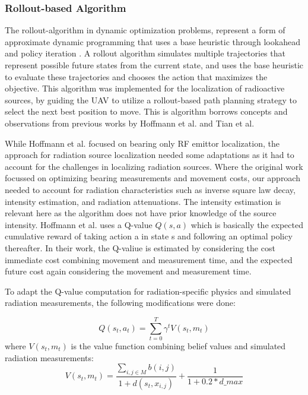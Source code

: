 \documentclass[../report.tex]{subfiles}
\begin{document}
    \subsubsection{Rollout-based Algorithm}
    The rollout-algorithm in dynamic optimization problems, represent a form of approximate dynamic programming that uses a base heuristic through lookahead and policy iteration \cite{bertsekas2013rollout}. 
    A rollout algorithm simulates multiple trajectories that represent possible future states from the current state, and uses the base heuristic to evaluate these trajectories and chooses the 
    action that maximizes the objective. This algorithm was implemented for the localization of radioactive sources, by guiding the UAV to utilize a rollout-based path planning strategy to select 
    the next best position to move. This is algorithm borrows concepts and observations from previous works by Hoffmann et al. \cite{rolloutHoffmann2019} and Tian et al. \cite{rolloutMultiStepLookaheadTian2008}


    While Hoffmann et al. focused on bearing only RF emittor localization, the approach for radiation source localization needed some adaptations as it had to account for the challenges in localizing 
    radiation sources. Where the original work focussed on optimizing bearing measurements and movement costs, our approach needed to account for radiation characteristics such as
    inverse square law decay, intensity estimation, and radiation attenuations. The intensity estimation is relevant here as the algorithm does not have prior knowledge of the source intensity. 
    Hoffmann et al. uses a Q-value $ Q(s,a) $ which is basically the expected cumulative reward of taking action a in state s and following an optimal policy thereafter. In their work, 
    the Q-valiue is estimated by considering the cost immediate cost combining movement and measurement time, and the expected future cost again considering the movement and measurement time.
    

    To adapt the Q-value computation for radiation-specific physics and simulated radiation measurements, the following modifications were done:

    \begin{equation}
        Q(s_t,a_t) = \sum_{t=0}^{T} \gamma^t V(s_t, m_t)
    \end{equation}
    where $ V(s_t,m_t) $ is the value function combining belief values and simulated radiation measurements:
    \begin{equation}
        V(s_t,m_t) = \frac{\sum_{i,j \in M}b(i,j)}{1 + d(s_t, x_{i,j})} + \frac{1}{1 + 0.2*d\_max}
    \end{equation}
\end{document}
